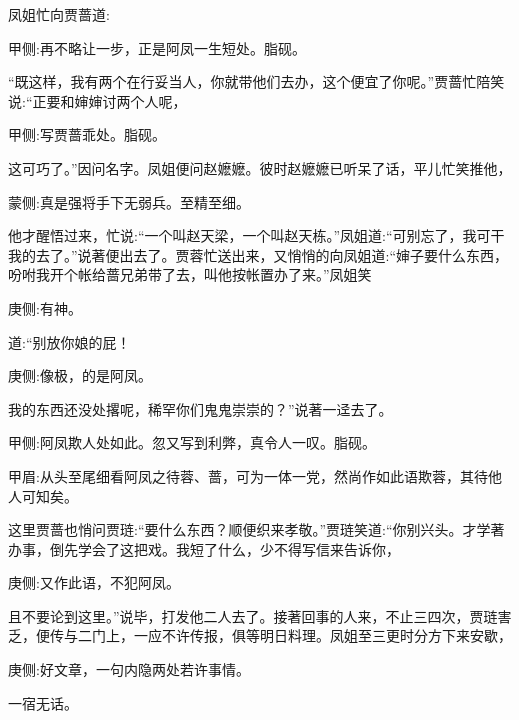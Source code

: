 \begin{parag}
    凤姐忙向贾蔷道:\begin{note}甲侧:再不略让一步，正是阿凤一生短处。脂砚。\end{note}“既这样，我有两个在行妥当人，你就带他们去办，这个便宜了你呢。”贾蔷忙陪笑说:“正要和婶婶讨两个人呢，\begin{note}甲侧:写贾蔷乖处。脂砚。\end{note}这可巧了。”因问名字。凤姐便问赵嬷嬷。彼时赵嬷嬷已听呆了话，平儿忙笑推他，\begin{note}蒙侧:真是强将手下无弱兵。至精至细。\end{note}他才醒悟过来，忙说:“一个叫赵天梁，一个叫赵天栋。”凤姐道:“可别忘了，我可干我的去了。”说著便出去了。贾蓉忙送出来，又悄悄的向凤姐道:“婶子要什么东西，吩咐我开个帐给蔷兄弟带了去，叫他按帐置办了来。”凤姐笑\begin{note}庚侧:有神。\end{note}道:“别放你娘的屁！\begin{note}庚侧:像极，的是阿凤。\end{note}我的东西还没处撂呢，稀罕你们鬼鬼崇崇的？”说著一迳去了。\begin{note}甲侧:阿凤欺人处如此。忽又写到利弊，真令人一叹。脂砚。\end{note}\begin{note}甲眉:从头至尾细看阿凤之待蓉、蔷，可为一体一党，然尚作如此语欺蓉，其待他人可知矣。\end{note}
\end{parag}


\begin{parag}
    这里贾蔷也悄问贾琏:“要什么东西？顺便织来孝敬。”贾琏笑道:“你别兴头。才学著办事，倒先学会了这把戏。我短了什么，少不得写信来告诉你，\begin{note}庚侧:又作此语，不犯阿凤。\end{note}且不要论到这里。”说毕，打发他二人去了。接著回事的人来，不止三四次，贾琏害乏，便传与二门上，一应不许传报，俱等明日料理。凤姐至三更时分方下来安歇，\begin{note}庚侧:好文章，一句内隐两处若许事情。\end{note}一宿无话。
\end{parag}


